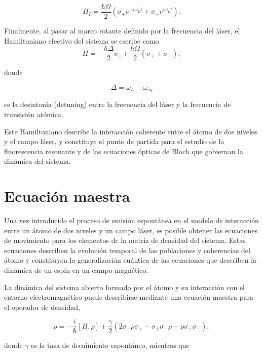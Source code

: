 \documentclass[11pt]{report}
\begin{document}
\begin{equation}
H_I =
\frac{\hbar \Omega}{2}
\left(
\sigma_+ e^{-i\omega_L t}
+
\sigma_- e^{i\omega_L t}
\right).
\end{equation}

Finalmente, al pasar al marco rotante definido por la frecuencia del láser, el Hamiltoniano efectivo del sistema se escribe como
\begin{equation}
H =
-\frac{\hbar \Delta}{2}\sigma_z
+
\frac{\hbar \Omega}{2}
(\sigma_+ + \sigma_-),
\end{equation}

donde

\begin{equation}
\Delta = \omega_L - \omega_{eg}
\end{equation}

es la desintonía (detuning) entre la frecuencia del láser y la frecuencia de transición atómica.

Este Hamiltoniano describe la interacción coherente entre el átomo de dos niveles y el campo láser, y constituye el punto de partida para el estudio de la fluorescencia resonante y de las ecuaciones ópticas de Bloch que gobiernan la dinámica del sistema.
\section{Ecuación maestra}

Una vez introducido el proceso de emisión espontánea en el modelo de interacción entre un átomo de dos niveles y un campo láser, es posible obtener las ecuaciones de movimiento para los elementos de la matriz de densidad del sistema. Estas ecuaciones describen la evolución temporal de las poblaciones y coherencias del átomo y constituyen la generalización cuántica de las ecuaciones que describen la dinámica de un espín en un campo magnético.

La dinámica del sistema abierto formado por el átomo y su interacción con el entorno electromagnético puede describirse mediante una ecuación maestra para el operador de densidad,

\begin{equation}
\dot{\rho} =
-\frac{i}{\hbar}[H,\rho]
+
\frac{\gamma}{2}
\left(
2\sigma_- \rho \sigma_+ -
\sigma_+\sigma_- \rho -
\rho \sigma_+\sigma_-
\right),
\end{equation}

donde $\gamma$ es la tasa de decaimiento espontáneo, mientras que
\end{document}

